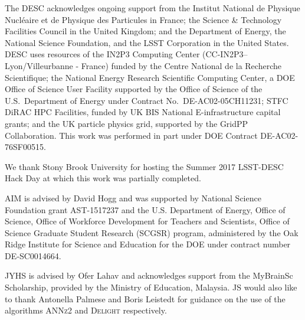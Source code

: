 %
%

The DESC acknowledges ongoing support from the Institut National de Physique Nucl\'eaire et de Physique des Particules in France; the Science \& Technology Facilities Council in the United Kingdom; and the Department of Energy, the National Science Foundation, and the LSST Corporation in the United States.
DESC uses resources of the IN2P3 Computing Center (CC-IN2P3--Lyon/Villeurbanne - France) funded by the Centre National de la Recherche Scientifique; the National Energy Research Scientific Computing Center, a DOE Office of Science User Facility supported by the Office of Science of the U.S.\ Department of Energy under Contract No.\ DE-AC02-05CH11231; STFC DiRAC HPC Facilities, funded by UK BIS National E-infrastructure capital grants; and the UK particle physics grid, supported by the GridPP Collaboration.
This work was performed in part under DOE Contract DE-AC02-76SF00515.

We thank Stony Brook University for hosting the Summer 2017 LSST-DESC Hack Day at which this work was partially completed.

AIM is advised by David Hogg and was supported by National Science Foundation grant AST-1517237 and the U.S. Department of Energy, Office of Science, Office of Workforce Development for Teachers and Scientists, Office of Science Graduate Student Research (SCGSR) program, administered by the Oak Ridge Institute for Science and Education for the DOE under contract number DE‐SC0014664.

JYHS is advised by Ofer Lahav and acknowledges support from the MyBrainSc Scholarship, provided by the Ministry of Education, Malaysia. JS would also like to thank Antonella Palmese and Boris Leistedt for guidance on the use of the algorithms \textsc{ANNz2} and \textsc{Delight} respectively.